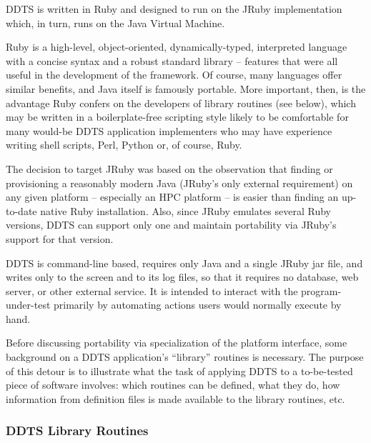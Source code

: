 \documentclass[conference]{IEEEtran}
\begin{document}
DDTS is written in Ruby \cite{ruby} and designed to run on the JRuby \cite{jruby} implementation which, in turn, runs on the Java Virtual Machine.

Ruby is a high-level, object-oriented, dynamically-typed, interpreted language with a concise syntax and a robust standard library -- features that were all useful in the development of the framework. Of course, many languages offer similar benefits, and Java itself is famously portable. More important, then, is the advantage Ruby confers on the developers of library routines (see below), which may be written in a boilerplate-free scripting style likely to be comfortable for many would-be DDTS application implementers who may have experience writing shell scripts, Perl, Python or, of course, Ruby.

The decision to target JRuby was based on the observation that finding or provisioning a reasonably modern Java (JRuby's only external requirement) on any given platform -- especially an HPC platform -- is easier than finding an up-to-date native Ruby installation. Also, since JRuby emulates several Ruby versions, DDTS can support only one and maintain portability via JRuby's support for that version.

DDTS is command-line based, requires only Java and a single JRuby jar file, and writes only to the screen and to its log files, so that it requires no database, web server, or other external service. It is intended to interact with the program-under-test primarily by automating actions users would normally execute by hand.

Before discussing portability via specialization of the platform interface, some background on a DDTS application's ``library'' routines is necessary. The purpose of this detour is to illustrate what the task of applying DDTS to a to-be-tested piece of software involves: which routines can be defined, what they do, how information from definition files is made available to the library routines, etc.

\subsubsection{DDTS Library Routines}
\end{document}
